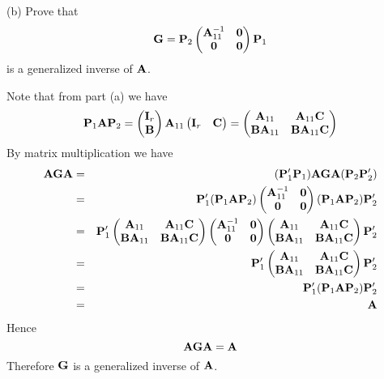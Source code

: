 \bigskip
\noindent
(b) Prove that
$${\bf G}={\bf P}_2
\left(\begin{matrix}
{\bf A}_{11}^{-1} & {\bf 0}\cr
{\bf 0} & {\bf 0}
\end{matrix}\right)
{\bf P}_1
$$
is a generalized inverse of $\bf A$.

\bigskip
\noindent
Note that from part (a) we have
$${\bf P}_1{\bf A}{\bf P}_2
=
\left(\begin{matrix}
{\bf I}_r\cr
{\bf B}
\end{matrix}\right){\bf A}_{11}
\left(\begin{matrix}
{\bf I}_r & {\bf C}
\end{matrix}\right)
=
\left(\begin{matrix}
{\bf A}_{11} & {\bf A}_{11}{\bf C}\cr
{\bf B}{\bf A}_{11} & {\bf B}{\bf A}_{11}{\bf C}
\end{matrix}\right)
$$
By matrix multiplication we have
\begin{eqnarray*}
{\bf AGA}
&=&
({\bf P}_1'{\bf P}_1){\bf AGA}({\bf P}_2{\bf P}_2')\\
&=&
{\bf P}_1'
({\bf P}_1{\bf A}{\bf P}_2)
\left(\begin{matrix}
{\bf A}_{11}^{-1} & {\bf 0}\cr
{\bf 0} & {\bf 0}
\end{matrix}\right)
({\bf P}_1{\bf A}{\bf P}_2)
{\bf P}_2'\\
&=&
{\bf P}_1'
\left(\begin{matrix}
{\bf A}_{11} & {\bf A}_{11}{\bf C}\cr
{\bf B}{\bf A}_{11} & {\bf B}{\bf A}_{11}{\bf C}
\end{matrix}\right)
%
\left(\begin{matrix}
{\bf A}_{11}^{-1} & {\bf 0}\cr
{\bf 0} & {\bf 0}
\end{matrix}\right)
%
\left(\begin{matrix}
{\bf A}_{11} & {\bf A}_{11}{\bf C}\cr
{\bf B}{\bf A}_{11} & {\bf B}{\bf A}_{11}{\bf C}
\end{matrix}\right)
{\bf P}_2'\\
&=&
{\bf P}_1'
\left(\begin{matrix}
{\bf A}_{11} & {\bf A}_{11}{\bf C}\cr
{\bf B}{\bf A}_{11} & {\bf B}{\bf A}_{11}{\bf C}
\end{matrix}\right)
{\bf P}_2'\\
&=&
{\bf P}_1'({\bf P}_1{\bf A}{\bf P}_2){\bf P}_2'\\
&=&
{\bf A}
\end{eqnarray*}
Hence
$${\bf A}{\bf G}{\bf A}={\bf A}$$
Therefore $\bf G$ is a generalized inverse of $\bf A$.

